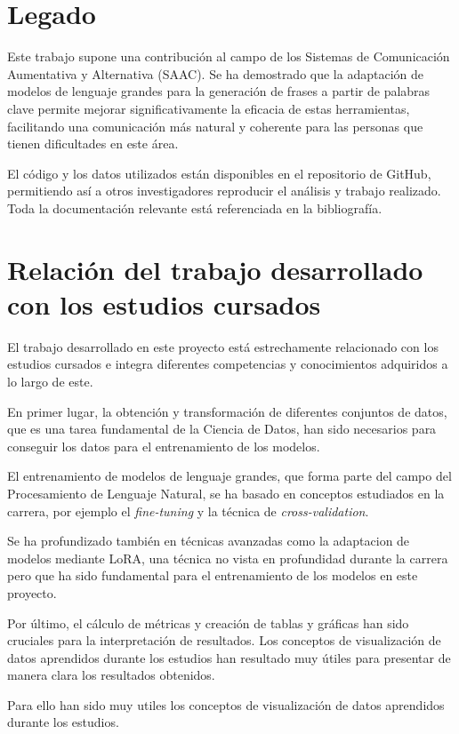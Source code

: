 \documentclass[11pt,spanish,listoffigures,listoftables]{tfgetsinf}
\begin{document}
\section{Legado}

Este trabajo supone una contribución al campo de los Sistemas de Comunicación Aumentativa y Alternativa (SAAC). Se ha demostrado que la adaptación de modelos de lenguaje grandes para la generación de frases a partir de palabras clave permite mejorar significativamente la eficacia de estas herramientas, facilitando una comunicación más natural y coherente para las personas que tienen dificultades en este área.

El código y los datos utilizados están disponibles en el repositorio de GitHub, permitiendo así a otros investigadores reproducir el análisis y trabajo realizado. Toda la documentación relevante está referenciada en la bibliografía.

\section{Relación del trabajo desarrollado con los estudios cursados}

El trabajo desarrollado en este proyecto está estrechamente relacionado con los estudios cursados e integra diferentes competencias y conocimientos adquiridos a lo largo de este. 

En primer lugar, la obtención y transformación de diferentes conjuntos de datos, que es una tarea fundamental de la Ciencia de Datos, han sido necesarios para conseguir los datos para el entrenamiento de los modelos.

El entrenamiento de  modelos de lenguaje grandes, que forma parte del campo del Procesamiento de Lenguaje Natural, se ha basado en conceptos estudiados en la carrera, por ejemplo el \textit{fine-tuning} y la técnica de \textit{cross-validation}.

Se ha profundizado también en técnicas avanzadas como la adaptacion de modelos mediante LoRA, una técnica no vista en profundidad durante la carrera pero que ha sido fundamental para el entrenamiento de los modelos en este proyecto.

Por último, el cálculo de métricas y creación de tablas y gráficas han sido cruciales para la interpretación de resultados. Los conceptos de visualización de datos  aprendidos durante los estudios han resultado muy útiles para presentar de manera clara los resultados obtenidos.

 Para ello han sido muy utiles los conceptos de visualización de datos aprendidos durante los estudios.
\end{document}
